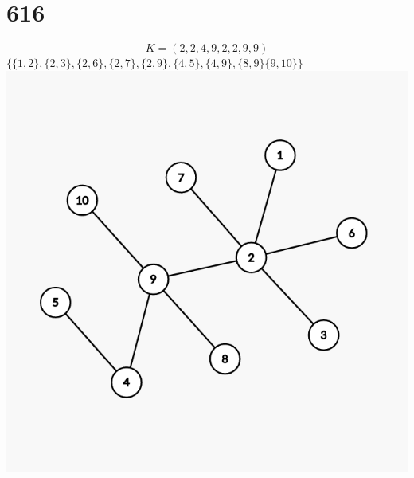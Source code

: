 \documentclass[a4paper, 12pt]{article}
\begin{document}
\section*{616}
\[
    K = (2,2,4,9,2,2,9,9)
\]
$ \{\{1,2\},\{2,3\},\{2,6\},\{2,7\},\{2,9\},\{4,5\},\{4,9\},\{8,9\}\{9,10\}\} $\\
\includegraphics{616.png}\\





 
\end{document}

